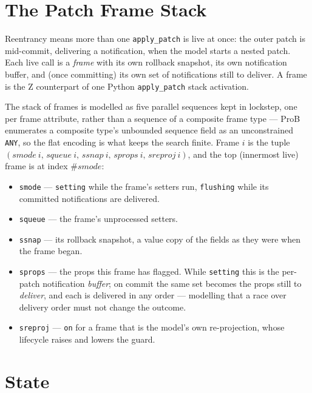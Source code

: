 \documentclass[a4paper,10pt,fleqn]{article}
\begin{document}
\section{The Patch Frame Stack}

Reentrancy means more than one \texttt{apply\_patch} is live at once: the outer
patch is mid-commit, delivering a notification, when the model starts a nested
patch.  Each live call is a \emph{frame} with its own rollback snapshot, its own
notification buffer, and (once committing) its own set of notifications still to
deliver.  A frame is the Z counterpart of one Python \texttt{apply\_patch} stack
activation.

The stack of frames is modelled as five parallel sequences kept in lockstep, one
per frame attribute, rather than a sequence of a composite frame type --- ProB
enumerates a composite type's unbounded sequence field as an unconstrained
\texttt{ANY}, so the flat encoding is what keeps the search finite.  Frame $i$ is
the tuple $(smode~i,\, squeue~i,\, ssnap~i,\, sprops~i,\, sreproj~i)$, and the
top (innermost live) frame is at index $\# smode$:

\begin{itemize}
  \item \texttt{smode} --- \texttt{setting} while the frame's setters run,
    \texttt{flushing} while its committed notifications are delivered.
  \item \texttt{squeue} --- the frame's unprocessed setters.
  \item \texttt{ssnap} --- its rollback snapshot, a value copy of the fields as
    they were when the frame began.
  \item \texttt{sprops} --- the props this frame has flagged.  While
    \texttt{setting} this is the per-patch notification \emph{buffer}; on commit
    the same set becomes the props still to \emph{deliver}, and each is delivered
    in any order --- modelling that a race over delivery order must not change the
    outcome.
  \item \texttt{sreproj} --- \texttt{on} for a frame that is the model's own
    re-projection, whose lifecycle raises and lowers the guard.
\end{itemize}

\section{State}
\end{document}
